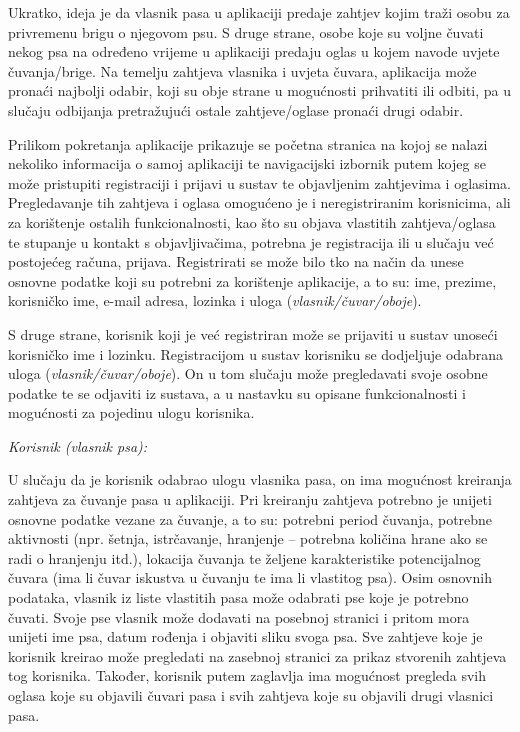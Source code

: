		Ukratko, ideja je da vlasnik pasa u aplikaciji predaje zahtjev kojim traži osobu za privremenu brigu o njegovom psu. S druge strane, osobe koje su voljne čuvati nekog psa na određeno vrijeme u aplikaciji predaju oglas u kojem navode uvjete čuvanja/brige. Na temelju zahtjeva vlasnika i uvjeta čuvara, aplikacija može pronaći najbolji odabir, koji su obje strane u mogućnosti prihvatiti ili odbiti, pa u slučaju odbijanja pretražujući  ostale zahtjeve/oglase pronaći drugi odabir. 
		
		Prilikom pokretanja aplikacije prikazuje se početna stranica na kojoj se nalazi nekoliko informacija o samoj aplikaciji te navigacijski izbornik putem kojeg se može pristupiti registraciji i prijavi u sustav te objavljenim zahtjevima i oglasima. Pregledavanje tih zahtjeva i oglasa omogućeno je i neregistriranim korisnicima, ali za korištenje ostalih funkcionalnosti, kao što su objava vlastitih zahtjeva/oglasa te stupanje u kontakt s objavljivačima, potrebna je registracija ili u slučaju već postojećeg računa, prijava. Registrirati se može bilo tko na način da unese osnovne podatke koji su potrebni za korištenje aplikacije, a to su: ime, prezime, korisničko ime, e-mail adresa, lozinka i uloga (\textit{vlasnik/čuvar/oboje}). 
		
		S druge strane, korisnik koji je već registriran može se prijaviti u sustav unoseći korisničko ime i lozinku. Registracijom u sustav korisniku se dodjeljuje odabrana uloga (\textit{vlasnik/čuvar/oboje}). On u tom slučaju može pregledavati svoje osobne podatke te se odjaviti iz sustava, a u nastavku su opisane funkcionalnosti i mogućnosti za pojedinu ulogu korisnika. 
		
		\textit{Korisnik (vlasnik psa):}
		
		U slučaju da je korisnik odabrao ulogu vlasnika pasa, on ima mogućnost kreiranja zahtjeva za čuvanje pasa u aplikaciji. Pri kreiranju zahtjeva potrebno je unijeti osnovne podatke vezane za čuvanje, a to su: potrebni period čuvanja, potrebne aktivnosti (npr. šetnja, istrčavanje, hranjenje – potrebna količina hrane ako se radi o hranjenju itd.), lokacija čuvanja te željene karakteristike potencijalnog čuvara (ima li čuvar iskustva u čuvanju te ima li vlastitog psa). Osim osnovnih podataka, vlasnik iz liste vlastitih pasa može odabrati pse koje je potrebno čuvati. Svoje pse vlasnik može dodavati na posebnoj stranici i pritom mora unijeti ime psa, datum rođenja i objaviti sliku svoga psa. Sve zahtjeve koje je korisnik kreirao može pregledati na zasebnoj stranici za prikaz stvorenih zahtjeva tog korisnika. Također, korisnik putem zaglavlja ima mogućnost pregleda svih oglasa koje su objavili čuvari pasa i svih zahtjeva koje su objavili drugi vlasnici pasa.
		
